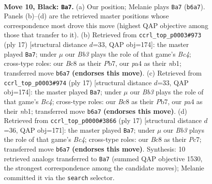 \documentclass[11pt]{article}
\begin{document}
\clearpage

\begin{figure}[p]\centering
\begin{subfigure}{0.46\textwidth}\centering
\resizebox{\linewidth}{!}{%
\newchessgame
\chessboard[
  setfen={r1bq1rk1/1pp2pp1/pbnp1n1p/4p2P/PPB1P3/2PP1N2/5PP1/RNBQ1RK1 b - - 0 10},
  showmover=false,
  pgfstyle=straightmove, color=movearrow, markmove={b6-a7}
]}
\caption{}
\end{subfigure}\hfill
\begin{subfigure}{0.46\textwidth}\centering
\resizebox{\linewidth}{!}{%
\newchessgame
\chessboard[
  setfen={r1bq1rk1/1pp2pp1/p1np1n1p/2b1p3/P1B1P3/2PP1N1P/1P3PP1/RNBQ1RK1 b - - 0 9},
  showmover=false,
  pgfstyle=straightmove, color=movearrow, markmove={c5-a7}
]}
\caption{}
\end{subfigure}
\\[4pt]
\begin{subfigure}{0.46\textwidth}\centering
\resizebox{\linewidth}{!}{%
\newchessgame
\chessboard[
  setfen={r1bq1rk1/1pp2pp1/p1np1n1p/2b1p3/P1B1P3/2PP1N1P/1P3PP1/RNBQ1RK1 b - - 0 9},
  showmover=false,
  pgfstyle=straightmove, color=movearrow, markmove={c5-a7}
]}
\caption{}
\end{subfigure}\hfill
\begin{subfigure}{0.46\textwidth}\centering
\resizebox{\linewidth}{!}{%
\newchessgame
\chessboard[
  setfen={r1bq1rk1/1pp2pp1/p1np1n1p/2b1p3/P1B1P3/2PP1N1P/1P3PP1/RNBQR1K1 b - - 0 9},
  showmover=false,
  pgfstyle=straightmove, color=movearrow, markmove={c5-a7}
]}
\caption{}
\end{subfigure}
\caption{\textbf{Move 10, Black: \texttt{Ba7}.} (a) Our position; Melanie plays \texttt{Ba7} (\texttt{b6a7}). Panels (b)--(d) are the retrieved master positions whose correspondence most drove this move (highest QAP objective among those that transfer to it). (b) Retrieved from \texttt{ccrl\_top\_p0003\#973} (ply 17) [structural distance $d$=33, QAP obj=174]: the master played \texttt{Ba7}; under $\mu$ our \emph{Bb3} plays the role of that game's \emph{Bc4}; cross-type roles: our \emph{B}c8 as their \emph{P}b7, our \emph{p}a4 as their \emph{n}b1; transferred move \texttt{b6a7} \textbf{(endorses this move)}. (c) Retrieved from \texttt{ccrl\_top\_p0003\#974} (ply 17) [structural distance $d$=33, QAP obj=174]: the master played \texttt{Ba7}; under $\mu$ our \emph{Bb3} plays the role of that game's \emph{Bc4}; cross-type roles: our \emph{B}c8 as their \emph{P}b7, our \emph{p}a4 as their \emph{n}b1; transferred move \texttt{b6a7} \textbf{(endorses this move)}. (d) Retrieved from \texttt{ccrl\_top\_p0000\#3866} (ply 17) [structural distance $d$=36, QAP obj=171]: the master played \texttt{Ba7}; under $\mu$ our \emph{Bb3} plays the role of that game's \emph{Bc4}; cross-type roles: our \emph{B}c8 as their \emph{P}c7; transferred move \texttt{b6a7} \textbf{(endorses this move)}. Synthesis: 10 retrieved analogs transferred to \texttt{Ba7} (summed QAP objective 1530, the strongest correspondence among the candidate moves); Melanie committed it via the \texttt{search} selector.}
\label{fig:thought-m19}
\end{figure}
\end{document}
